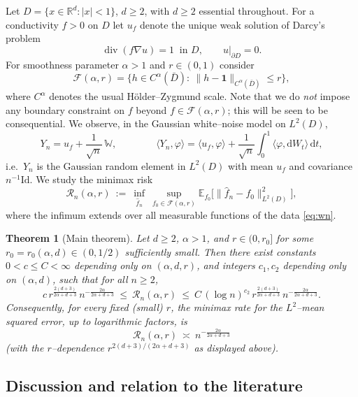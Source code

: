 \documentclass[11pt]{article}
\newtheorem{theorem}{Theorem}[section]
\newcommand{\R}{\mathbb{R}}
\newcommand{\E}{\mathbb{E}}
\newcommand{\W}{\mathbb{W}}
\newcommand{\1}{\mathbf{1}}
\newcommand{\norm}[1]{\lVert #1\rVert}
\newcommand{\inner}[2]{\langle #1,#2\rangle}
\newcommand{\ddd}{\mathrm{d}}
\newcommand{\F}{\mathcal{F}}
\DeclareMathOperator{\divg}{div}
\begin{document}
Let $D=\{x\in\R^d:|x|<1\}$, $d\ge 2$, with $d\ge 2$ essential throughout. For a
conductivity $f>0$ on $D$ let $u_f$ denote the unique weak solution of Darcy's problem
\begin{equation}\label{eq:pde}
\divg(f\nabla u)=1\ \text{ in } D,\qquad u|_{\partial D}=0 .
\end{equation}
For smoothness parameter $\alpha>1$ and $r\in(0,1)$ consider
\[
\F(\alpha,r)=\big\{h\in C^\alpha(\bar D):\ \norm{h-\1}_{C^\alpha(\bar D)}\le r\big\},
\]
where $C^\alpha$ denotes the usual H\"older--Zygmund scale. Note that we do
\emph{not} impose any boundary constraint on $f$ beyond $f\in \F(\alpha,r)$; this
will be seen to be consequential. We observe, in the Gaussian white--noise model on
$L^2(D)$,
\begin{equation}\label{eq:wn}
Y_n=u_f+\frac{1}{\sqrt n}\,\W,\qquad\qquad
\inner{Y_n}{\varphi}=\inner{u_f}{\varphi}+\frac{1}{\sqrt n}\int_0^1\!\inner{\varphi}{\ddd W_t}\,\ddd t ,
\end{equation}
i.e.\ $Y_n$ is the Gaussian random element in $L^2(D)$ with mean $u_f$ and covariance
$n^{-1}\mathrm{Id}$. We study the minimax risk
\begin{equation}\label{eq:minimax}
\mathcal R_n(\alpha,r)\ :=\ \inf_{\hat f_n}\ \sup_{f_0\in\F(\alpha,r)}
\E_{f_0}\Big[\norm{\hat f_n-f_0}^2_{L^2(D)}\Big],
\end{equation}
where the infimum extends over all measurable functions of the data \eqref{eq:wn}.

\begin{theorem}[Main theorem]\label{thm:main}
Let $d\ge 2$, $\alpha>1$, and $r\in(0,r_0]$ for some $r_0=r_0(\alpha,d)\in(0,1/2)$
sufficiently small. Then there exist constants $0<c\le C<\infty$ depending only on
$(\alpha,d,r)$, and integers $c_1,c_2$ depending only on $(\alpha,d)$, such that for all
$n\ge 2$,
\[
c\,r^{\frac{2(d+3)}{2\alpha+d+3}}\,n^{-\frac{2\alpha}{2\alpha+d+3}}
\ \le\ \mathcal R_n(\alpha,r)\ \le\
C\,(\log n)^{c_2}\,r^{\frac{2(d+3)}{2\alpha+d+3}}\,n^{-\frac{2\alpha}{2\alpha+d+3}} .
\]
Consequently, for every fixed (small) $r$, the minimax rate for the $L^2$--mean squared
error, up to logarithmic factors, is
\begin{equation}\label{eq:rate}
\boxed{\ \mathcal R_n(\alpha,r)\ \asymp\ n^{-\frac{2\alpha}{2\alpha+d+3}}\ }
\end{equation}
(with the $r$--dependence $r^{2(d+3)/(2\alpha+d+3)}$ as displayed above).
\end{theorem}

\subsection{Discussion and relation to the literature}
\end{document}
